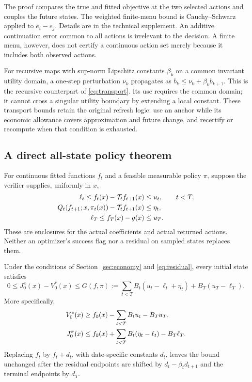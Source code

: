 \documentclass[ecta,nameyear,draft]{econsocart}
\begin{document}
The proof compares the true and fitted objective at the two selected actions and couples the future states. The weighted finite-menu bound is Cauchy--Schwarz applied to $e_i-e_j$. Details are in the technical supplement. An additive continuation error common to all actions is irrelevant to the decision. A finite menu, however, does not certify a continuous action set merely because it includes both observed actions.

For recursive maps with sup-norm Lipschitz constants $\beta_k$ on a common invariant utility domain, a one-step perturbation $\nu_k$ propagates as $b_k\leq\nu_k+\beta_kb_{k+1}$. This is the recursive counterpart of \eqref{eq:transport}. Its use requires the common domain; it cannot cross a singular utility boundary by extending a local constant. These transport bounds retain the original refresh logic: use an anchor while its economic allowance covers approximation and future change, and recertify or recompute when that condition is exhausted.

\subsection{A direct all-state policy theorem}
For continuous fitted functions $f_t$ and a feasible measurable policy $\pi$, suppose the verifier supplies, uniformly in $x$,
\begin{align}\label{eq:residual}
 \ell_t\leq f_t(x)-\mathcal T_tf_{t+1}(x)&\leq u_t,\qquad t<T,\\
 Q_t(f_{t+1};x,\pi_t(x))-\mathcal T_tf_{t+1}(x)&\leq\eta_t,\notag\\
 \ell_T\leq f_T(x)-g(x)&\leq u_T.\notag
\end{align}
These are enclosures for the actual coefficients and actual returned actions. Neither an optimizer's success flag nor a residual on sampled states replaces them.

\begin{theorem}\label{thm:policy}
Under the conditions of Section~\ref{sec:economy} and \eqref{eq:residual}, every initial state satisfies
\begin{equation}\label{eq:gap}
 0\leq J^\pi_0(x)-V_0^*(x)\leq
 G(f,\pi):=\sum_{t<T}B_t(u_t-\ell_t+\eta_t)+B_T(u_T-\ell_T).
\end{equation}
More specifically,
\begin{align}\label{eq:brackets}
 V_0^*(x)&\geq f_0(x)-\sum_{t<T}B_tu_t-B_Tu_T,\\
 J_0^\pi(x)&\leq f_0(x)+\sum_{t<T}B_t(\eta_t-\ell_t)-B_T\ell_T.\notag
\end{align}
Replacing $f_t$ by $f_t+d_t$, with date-specific constants $d_t$, leaves the bound unchanged after the residual endpoints are shifted by $d_t-\beta_td_{t+1}$ and the terminal endpoints by $d_T$.
\end{theorem}
\end{document}
